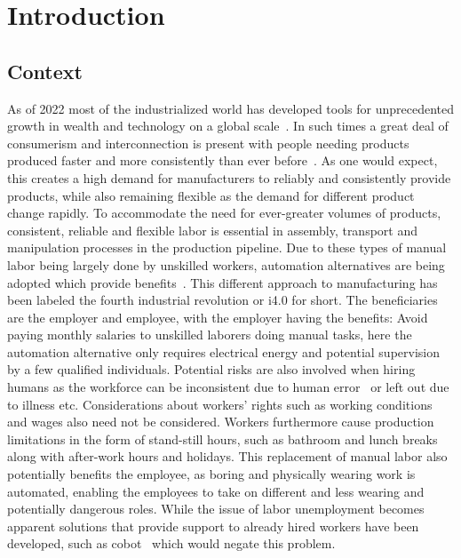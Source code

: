 \chapter{Introduction}\label{ch:intro}

\section{Context}\label{sec:intro-context}

As of 2022 most of the industrialized world has developed tools for unprecedented growth in wealth and technology on a global scale~\cite[Chapter 4]{technology-and-inequalities}. In such times a great deal of consumerism and interconnection is present with people needing products produced faster and more consistently than ever before~\cite[Chapter 4]{technology-and-inequalities}. 
As one would expect, this creates a high demand for manufacturers to reliably and consistently provide products, while also remaining flexible as the demand for different product change rapidly. 
To accommodate the need for ever-greater volumes of products, consistent, reliable and flexible labor is essential in assembly, transport and manipulation processes in the production pipeline. Due to these types of manual labor being largely done by unskilled workers, automation alternatives are being adopted which provide benefits~\cite[Chapter 4]{technology-and-inequalities}. This different approach to manufacturing has been labeled the fourth industrial revolution or i4.0 for short.
The beneficiaries are the employer and employee, with the employer having the benefits: Avoid paying monthly salaries to unskilled laborers doing manual tasks, here the automation alternative only requires electrical energy and potential supervision by a few qualified individuals. Potential risks are also involved when hiring humans as the workforce can be inconsistent due to human error~\cite{analysis-and-control-of-human-error} or left out due to illness etc. Considerations about workers' rights such as working conditions and wages also need not be considered. Workers furthermore cause production limitations in the form of stand-still hours, such as bathroom and lunch breaks along with after-work hours and holidays.
This replacement of manual labor also potentially benefits the employee, as boring and physically wearing work is automated, enabling the employees to take on different and less wearing and potentially dangerous roles. While the issue of labor unemployment becomes apparent solutions that provide support to already hired workers have been developed, such as \gls{cobot}~\cite{cobots-and-the-benefits-of-their-implementation-in-intelligent-manufacturing} which would negate this problem. \medskip

